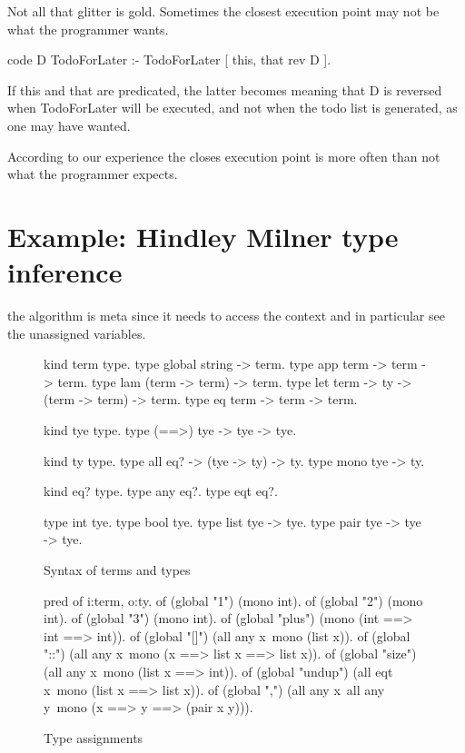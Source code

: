 \documentclass[a4paper, 11pt]{book}
\begin{document}
Not all that glitter is gold. Sometimes the closest execution
point may not be what the programmer wants.

\begin{elpicode}
  code D TodoForLater  :-
    TodoForLater [ this, that {rev D} ].
\end{elpicode}

If this and that are predicated, the latter becomes
 meaning that
D is reversed when TodoForLater will be executed, and
not when the todo list is generated, as one may have wanted.

According to our experience the closes execution point
is more often than not what the programmer expects.

\section{Example: Hindley Milner type inference}

the algorithm is meta since it needs to access the context and
in particular see the unassigned variables.

\begin{figure}
\begin{elpicode}
kind term type.
type global  string -> term.
type app term -> term -> term.
type lam (term -> term) -> term.
type let term -> ty -> (term -> term) -> term.
type eq  term -> term -> term.

kind tye type.
type (==>) tye -> tye -> tye.  

kind ty type.
type all    eq? -> (tye -> ty) -> ty.
type mono   tye -> ty.

kind eq? type.
type any eq?. %
type eqt eq?. %

type int   tye.
type bool  tye.
type list  tye -> tye.
type pair  tye -> tye -> tye.
\end{elpicode}
\caption[syntax]{Syntax of terms and types\label{hm:syntax}}
\end{figure}


\begin{figure}
\begin{elpicode}
pred of i:term, o:ty.
of (global "1")      (mono int).
of (global "2")      (mono int).
of (global "3")      (mono int).
of (global "plus")   (mono (int ==> int ==> int)).
of (global "[]")    (all any x\ mono (list x)).
of (global "::")    (all any x\ mono (x ==> list x ==> list x)).
of (global "size")  (all any x\ mono (list x ==> int)).
of (global "undup") (all eqt x\ mono (list x ==> list x)).
of (global ",")     (all any x\ all any y\ mono (x ==> y ==> (pair x y))).
\end{elpicode}
\caption[type assignments]{Type assignments\label{hm:env}}
\end{figure}
  
\end{document}
